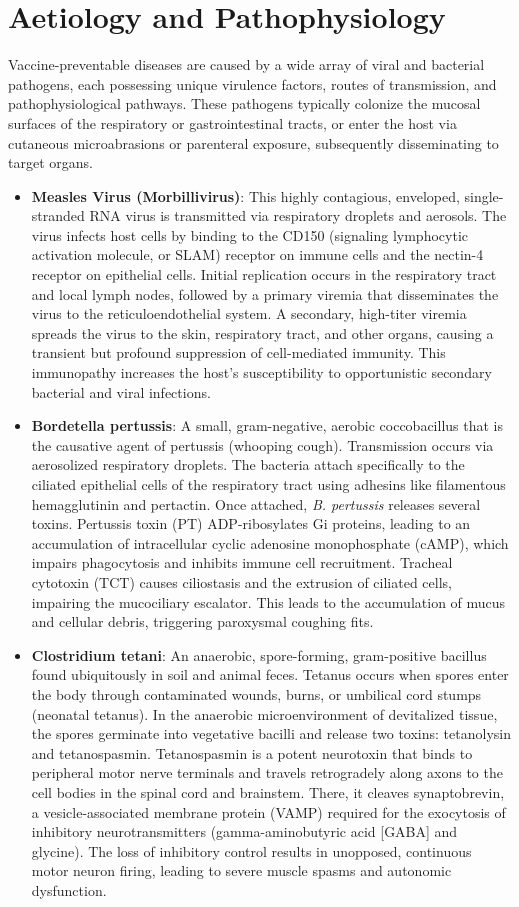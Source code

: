 \section*{Aetiology and Pathophysiology}
Vaccine-preventable diseases are caused by a wide array of viral and bacterial pathogens, each possessing unique virulence factors, routes of transmission, and pathophysiological pathways. These pathogens typically colonize the mucosal surfaces of the respiratory or gastrointestinal tracts, or enter the host via cutaneous microabrasions or parenteral exposure, subsequently disseminating to target organs.
\begin{itemize}
    \item \textbf{Measles Virus (Morbillivirus)}: This highly contagious, enveloped, single-stranded RNA virus is transmitted via respiratory droplets and aerosols. The virus infects host cells by binding to the CD150 (signaling lymphocytic activation molecule, or SLAM) receptor on immune cells and the nectin-4 receptor on epithelial cells. Initial replication occurs in the respiratory tract and local lymph nodes, followed by a primary viremia that disseminates the virus to the reticuloendothelial system. A secondary, high-titer viremia spreads the virus to the skin, respiratory tract, and other organs, causing a transient but profound suppression of cell-mediated immunity. This immunopathy increases the host's susceptibility to opportunistic secondary bacterial and viral infections.
    \item \textbf{Bordetella pertussis}: A small, gram-negative, aerobic coccobacillus that is the causative agent of pertussis (whooping cough). Transmission occurs via aerosolized respiratory droplets. The bacteria attach specifically to the ciliated epithelial cells of the respiratory tract using adhesins like filamentous hemagglutinin and pertactin. Once attached, \textit{B. pertussis} releases several toxins. Pertussis toxin (PT) ADP-ribosylates Gi proteins, leading to an accumulation of intracellular cyclic adenosine monophosphate (cAMP), which impairs phagocytosis and inhibits immune cell recruitment. Tracheal cytotoxin (TCT) causes ciliostasis and the extrusion of ciliated cells, impairing the mucociliary escalator. This leads to the accumulation of mucus and cellular debris, triggering paroxysmal coughing fits.
    \item \textbf{Clostridium tetani}: An anaerobic, spore-forming, gram-positive bacillus found ubiquitously in soil and animal feces. Tetanus occurs when spores enter the body through contaminated wounds, burns, or umbilical cord stumps (neonatal tetanus). In the anaerobic microenvironment of devitalized tissue, the spores germinate into vegetative bacilli and release two toxins: tetanolysin and tetanospasmin. Tetanospasmin is a potent neurotoxin that binds to peripheral motor nerve terminals and travels retrogradely along axons to the cell bodies in the spinal cord and brainstem. There, it cleaves synaptobrevin, a vesicle-associated membrane protein (VAMP) required for the exocytosis of inhibitory neurotransmitters (gamma-aminobutyric acid [GABA] and glycine). The loss of inhibitory control results in unopposed, continuous motor neuron firing, leading to severe muscle spasms and autonomic dysfunction.

\end{itemize}

